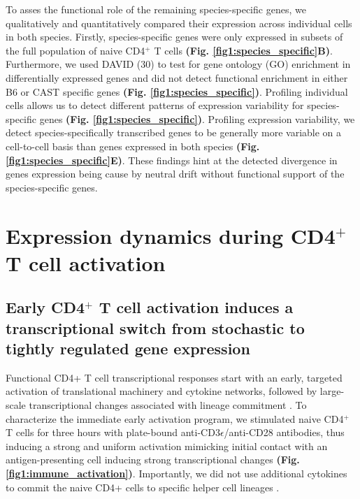 To asses the functional role of the remaining species-specific genes, we qualitatively and quantitatively compared their expression across individual cells in both species. Firstly, species-specific genes were only expressed in subsets of the full population of naive CD4$^+$ T cells \textbf{(Fig. \ref{fig1:species_specific}B)}. Furthermore, we used DAVID (30) to test for gene ontology (GO) enrichment in differentially expressed genes and did not detect functional enrichment in either B6 or CAST specific genes \textbf{(Fig. \ref{fig1:species_specific})}. Profiling individual cells allows us to detect different patterns of expression variability for species-specific genes \textbf{(Fig. \ref{fig1:species_specific})}. Profiling expression variability, we detect species-specifically transcribed genes to be generally more variable on a cell-to-cell basis than genes expressed in both species \textbf{(Fig. \ref{fig1:species_specific}E)}. These findings hint at the detected divergence in genes expression being cause by neutral drift without functional support of the species-specific genes.

\section{Expression dynamics during CD4$^+$ T cell activation}
\subsection*{Early CD4$^+$ T cell activation induces a transcriptional switch from stochastic to tightly regulated gene expression}

Functional CD4+ T cell transcriptional responses start with an early, targeted activation of translational machinery and cytokine networks, followed by large-scale transcriptional changes associated with lineage commitment \citep{Shay2013, Asmal2003}. To characterize the immediate early activation program, we stimulated naive CD4$^+$ T cells for three hours with plate-bound anti-CD3$\epsilon$/anti-CD28 antibodies, thus inducing a strong and uniform activation mimicking initial contact with an antigen-presenting cell inducing strong transcriptional changes \textbf{(Fig. \ref{fig1:immune_activation})}. Importantly, we did not use additional cytokines to commit the naive CD4+ cells to specific helper cell lineages \citep{Zhu2010}. \\


